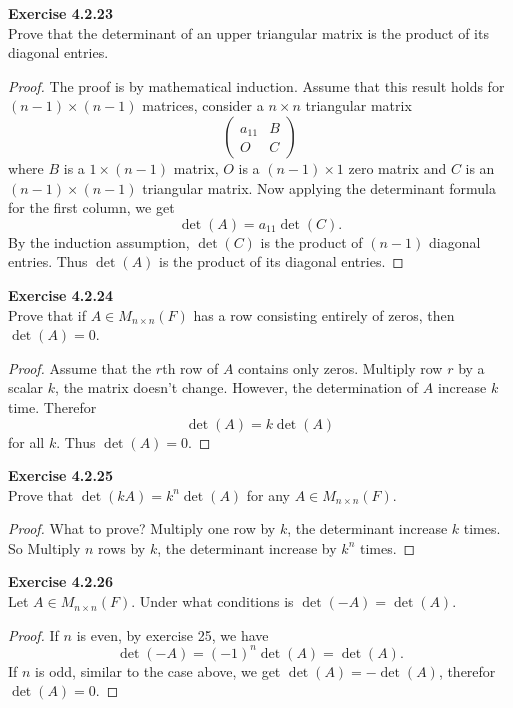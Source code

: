 \documentclass[12pt, a4paper]{article}
\theoremstyle{plain}
\newenvironment{exercise}[2][Exercise]
    { \begin{mdframed}[backgroundcolor=gray!20] \textbf{#1 #2} \\}
    {  \end{mdframed}}
\begin{document}
\begin{exercise}{4.2.23}
Prove that the determinant of an upper triangular matrix is the product of its diagonal entries.
\end{exercise}
	\begin{proof}
	The proof is by mathematical induction. Assume that this result holds for $(n-1)\times (n-1)$ matrices, consider a $n\times n$ triangular matrix
	\[
	\begin{pmatrix}
	a_11 & B\\
	O & C
	\end{pmatrix}
	\]
	where $B$ is a $1\times (n-1)$ matrix, $O$ is a $(n-1)\times 1$ zero matrix and $C$ is an $(n-1)\times (n-1)$ triangular matrix. Now applying the determinant formula for the first column, we get 
	\[
	\det(A)=a_{11} \det(C).
	\]
	By the induction assumption, $\det(C)$ is the product of $(n-1)$ diagonal entries. Thus $\det(A)$ is the product of its diagonal entries.
	\end{proof}

\begin{exercise}{4.2.24}
Prove that if $A\in M_{n\times n}(F)$ has a row consisting entirely of zeros, then $\det(A)=0$.
\end{exercise}
	\begin{proof}
	Assume that the $r$th row of $A$ contains only zeros. Multiply row $r$ by a scalar $k$, the matrix doesn't change. However, the determination of $A$ increase $k$ time. Therefor
	\[
	\det(A)=k\det(A)
	\]
	for all $k$. Thus $\det(A)=0$.
	\end{proof}
	
\begin{exercise}{4.2.25}
Prove that $\det(kA)=k^n\det(A)$ for any $A\in M_{n\times n}(F)$.
\end{exercise}
	\begin{proof}
	What to prove? Multiply one row by $k$, the determinant increase $k$ times. So Multiply $n$ rows by $k$, the determinant increase by $k^n$ times.
	\end{proof}
	
\begin{exercise}{4.2.26}
Let $A\in M_{n\times n}(F)$. Under what conditions is $\det(-A)=\det(A)$.
\end{exercise}
	\begin{proof}
	If $n$ is even, by exercise 25, we have
	\[
	\det(-A)=(-1)^{n}\det(A)=\det(A).
	\]
	If $n$ is odd, similar to the case above, we get $\det(A)=-\det(A)$, therefor $\det(A)=0$. 
	\end{proof}
	
\end{document}
